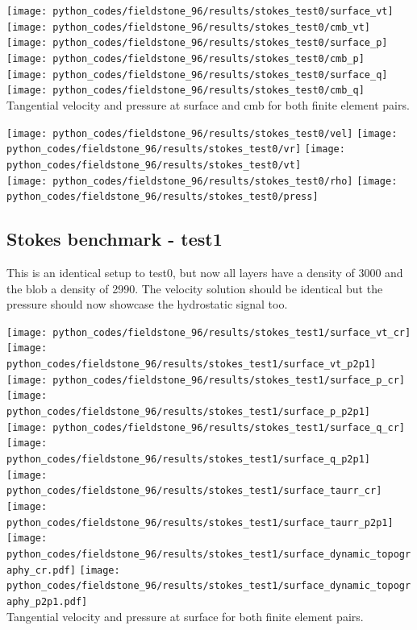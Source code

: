 \begin{center}
\texttt{[image: python\_codes/fieldstone\_96/results/stokes\_test0/surface\_vt]}
\texttt{[image: python\_codes/fieldstone\_96/results/stokes\_test0/cmb\_vt]}\\
\texttt{[image: python\_codes/fieldstone\_96/results/stokes\_test0/surface\_p]}
\texttt{[image: python\_codes/fieldstone\_96/results/stokes\_test0/cmb\_p]}\\
\texttt{[image: python\_codes/fieldstone\_96/results/stokes\_test0/surface\_q]}
\texttt{[image: python\_codes/fieldstone\_96/results/stokes\_test0/cmb\_q]}\\
{\captionfont Tangential velocity and pressure at surface and cmb for both finite element pairs.}
\end{center}


\begin{center}
\texttt{[image: python\_codes/fieldstone\_96/results/stokes\_test0/vel]}
\texttt{[image: python\_codes/fieldstone\_96/results/stokes\_test0/vr]}
\texttt{[image: python\_codes/fieldstone\_96/results/stokes\_test0/vt]}\\
\texttt{[image: python\_codes/fieldstone\_96/results/stokes\_test0/rho]}
\texttt{[image: python\_codes/fieldstone\_96/results/stokes\_test0/press]}
\end{center}


\newpage
\subsection*{Stokes benchmark - test1}

This is an identical setup to test0, but now all layers have a density of 3000 and the blob a density of 2990.
The velocity solution should be identical but the pressure should now showcase the hydrostatic signal too.

\begin{center}
\texttt{[image: python\_codes/fieldstone\_96/results/stokes\_test1/surface\_vt\_cr]}
\texttt{[image: python\_codes/fieldstone\_96/results/stokes\_test1/surface\_vt\_p2p1]}\\
\texttt{[image: python\_codes/fieldstone\_96/results/stokes\_test1/surface\_p\_cr]}
\texttt{[image: python\_codes/fieldstone\_96/results/stokes\_test1/surface\_p\_p2p1]}\\
\texttt{[image: python\_codes/fieldstone\_96/results/stokes\_test1/surface\_q\_cr]}
\texttt{[image: python\_codes/fieldstone\_96/results/stokes\_test1/surface\_q\_p2p1]}\\
\texttt{[image: python\_codes/fieldstone\_96/results/stokes\_test1/surface\_taurr\_cr]}
\texttt{[image: python\_codes/fieldstone\_96/results/stokes\_test1/surface\_taurr\_p2p1]}\\
\texttt{[image: python\_codes/fieldstone\_96/results/stokes\_test1/surface\_dynamic\_topography\_cr.pdf]}
\texttt{[image: python\_codes/fieldstone\_96/results/stokes\_test1/surface\_dynamic\_topography\_p2p1.pdf]}\\
{\captionfont Tangential velocity and pressure at surface for both finite element pairs.}
\end{center}

